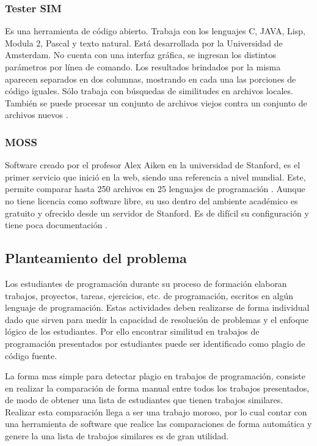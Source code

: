 \subsubsection{Tester SIM}
Es una herramienta de código abierto. Trabaja con los lenguajes C, JAVA, Lisp, Modula 2, Pascal y texto natural. Está desarrollada por la Universidad de Amsterdam. No cuenta con una interfaz gráfica, se ingresan los distintos parámetros por línea de comando. Los resultados brindados por la misma aparecen separados en dos columnas, mostrando en cada una las porciones de código iguales. Sólo trabaja con búsquedas de similitudes en archivos locales. También se puede procesar un conjunto de archivos viejos contra un conjunto de archivos nuevos  \cite{article1}.
\subsubsection{MOSS}
Software creado por el profesor Alex Aiken en la universidad de Stanford, es el primer servicio que inició en la web, siendo una referencia a nivel mundial. Este, permite comparar hasta 250 archivos en 25 lenguajes de programación \cite{Hage2010ACO}. Aunque no tiene licencia como software libre, su uso dentro del ambiente académico es gratuito y ofrecido desde un servidor de Stanford. Es de difícil su configuración y tiene poca documentación \cite{book1}.
\subsection{Planteamiento del problema}
Los estudiantes de programación durante su proceso de formación elaboran trabajos, proyectos, tareas, ejercicios, etc. de programación, escritos en algún lenguaje de programación. Estas actividades deben realizarse de forma individual dado que sirven para medir la capacidad de resolución de problemas y el enfoque lógico de los estudiantes. Por ello encontrar similitud en trabajos de programación presentados por estudiantes puede ser identificado como plagio de código fuente.

La forma mas simple para detectar plagio en trabajos de programación, consiste en realizar la comparación de forma manual entre todos los trabajos presentados, de modo de obtener una lista de estudiantes que tienen trabajos similares. Realizar esta comparación llega a ser una trabajo moroso, por lo cual contar con una herramienta de software que realice las comparaciones de forma automática y genere la una lista de trabajos similares es de gran utilidad.

